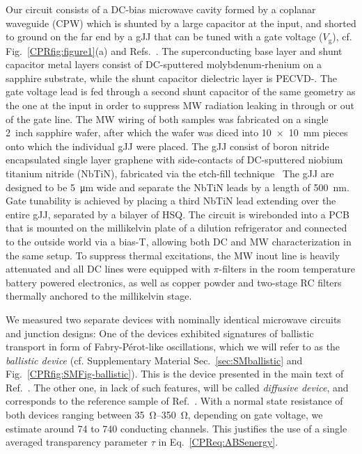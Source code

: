 Our circuit consists of a DC-bias microwave cavity formed by a coplanar waveguide (CPW) which is shunted by a large capacitor at the input, and shorted to ground on the far end by a gJJ that can be tuned with a gate voltage ($V_\text{g}$), cf. Fig.~\ref{CPRfig:figure1}(a) and Refs.~\cite{schmidtBallisticGrapheneSuperconducting2018,schmidtCurrentDetectionUsing2020,bosmanBroadbandArchitectureGalvanically2015c}.
%
The superconducting base layer and shunt capacitor metal layers consist of DC-sputtered molybdenum-rhenium on a sapphire substrate, while the shunt capacitor dielectric layer is PECVD-.
%
The gate voltage lead is fed through a second shunt capacitor of the same geometry as the one at the input in order to suppress MW radiation leaking in through or out of the gate line.
%
The MW wiring of both samples was fabricated on a single \SI{2}{inch} sapphire wafer, after which the wafer was diced into \SI{10x10}{\milli\meter} pieces onto which the individual gJJ were placed.
%
The gJJ consist of boron nitride encapsulated single layer graphene with side-contacts of DC-sputtered niobium titanium nitride (NbTiN), fabricated via the etch-fill technique~\cite{wangOneDimensionalElectricalContact2013b,schmidtBallisticGrapheneSuperconducting2018}
%
The gJJ are designed to be \SI{5}{\micro\meter} wide and separate the NbTiN leads by a length of \SI{500}{\nano\meter}.
%
Gate tunability is achieved by placing a third NbTiN lead extending over the entire gJJ, separated by a bilayer of HSQ.
%
The circuit is wirebonded into a PCB that is mounted on the millikelvin plate of a dilution refrigerator and connected to the outside world via a bias-T, allowing both DC and MW characterization in the same setup.
%
To suppress thermal excitations, the MW inout line is heavily attenuated and all DC lines were equipped with $\pi$-filters in the room temperature battery powered electronics, as well as copper powder and two-stage RC filters thermally anchored to the millikelvin stage.

We measured two separate devices with nominally identical microwave circuits and junction designs:
%
One of the devices exhibited signatures of ballistic transport in form of Fabry-Pérot-like oscillations, which we will refer to as the \textit{ballistic device} (cf. Supplementary Material Sec.~\ref{sec:SMballistic} and Fig.~\ref{CPRfig:SMFig-ballistic}).
%
This is the device presented in the main text of Ref.~\cite{schmidtBallisticGrapheneSuperconducting2018}.
%
The other one, in lack of such features, will be called \textit{diffusive device}, and corresponds to the reference sample of Ref.~\cite{schmidtBallisticGrapheneSuperconducting2018}.
%
With a normal state resistance of both devices ranging between \SIrange{35}{350}{\ohm}, depending on gate voltage, we estimate around 74 to 740 conducting channels.
%
This justifies the use of a single averaged transparency parameter $\tau$ in Eq.~\ref{CPReq:ABSenergy}.

